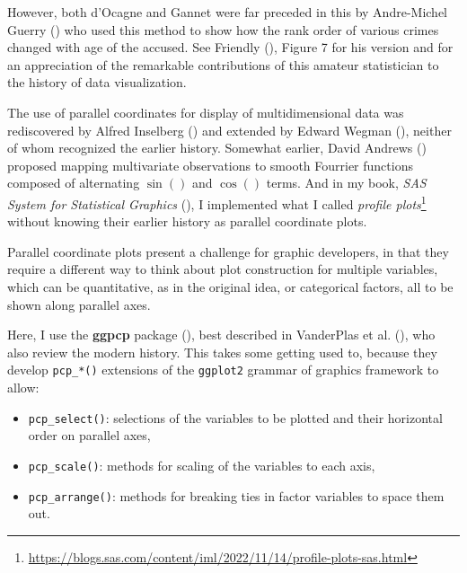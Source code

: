 \documentclass[
  letterpaper,
  10pt,
  krantz2]{krantz}
\providecommand{\tightlist}{%
  \setlength{\itemsep}{0pt}\setlength{\parskip}{0pt}}\usepackage{longtable,booktabs,array}
\providecommand{\href}[2]{#2\footnote{\url{#1}}}
\begin{document}
{\begin{tcolorbox}
However, both d'Ocagne and Gannet were far preceded in this by
Andre-Michel Guerry () who used this
method to show how the rank order of various crimes changed with age of
the accused. See Friendly (), Figure 7
for his version and for an appreciation of the remarkable contributions
of this amateur statistician to the history of data visualization.

The use of parallel coordinates for display of multidimensional data was
rediscovered by Alfred Inselberg ()
and extended by Edward Wegman (),
neither of whom recognized the earlier history. Somewhat earlier, David
Andrews () proposed mapping multivariate
observations to smooth Fourrier functions composed of alternating
\(\sin()\) and \(\cos()\) terms. And in my book, \emph{SAS System for
Statistical Graphics} (), I
implemented what I called
\href{https://blogs.sas.com/content/iml/2022/11/14/profile-plots-sas.html}{\emph{profile
plots}} without knowing their earlier history as parallel coordinate
plots.

\end{tcolorbox}

Parallel coordinate plots present a challenge for graphic developers, in
that they require a different way to think about plot construction for
multiple variables, which can be quantitative, as in the original idea,
or categorical factors, all to be shown along parallel axes.

Here, I use the \textbf{ggpcp} package (), best described in VanderPlas et al.
(), who also review the modern
history. This takes some getting used to, because they develop
\texttt{pcp\_*()} extensions of the \texttt{ggplot2} grammar of graphics
framework to allow:

\begin{itemize}
\tightlist
\item
  \texttt{pcp\_select()}: selections of the variables to be plotted and
  their horizontal order on parallel axes,
\item
  \texttt{pcp\_scale()}: methods for scaling of the variables to each
  axis,
\item
  \texttt{pcp\_arrange()}: methods for breaking ties in factor variables
  to space them out.
\end{itemize}

}
\end{document}
